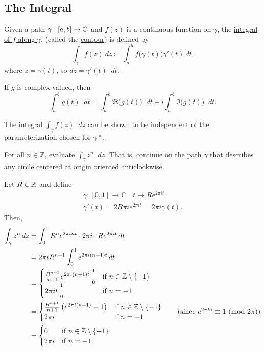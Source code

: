 \documentclass[11pt]{article}
\newcommand*\dif{\mathop{}\!d}
\newcommand{\Mod}[1]{\ (\mathrm{mod}\ #1)}
\begin{document}
\subsection{The Integral}
\begin{definition}
	Given a path $\gamma:[a,b] \to \mathbb{C}$ and $f(z)$ is a continuous function on
	$\gamma$, the \underline{integral of $f$ along $\gamma$}, (called the
	\underline{contour}) is defined by
	\begin{equation*}
		\int_\gamma f(z)\>dz \coloneqq \int^b_a f\big(\gamma(t)\big)\gamma'(t)\>dt.
	\end{equation*}
	where $z = \gamma(t)$, so $dz = \gamma'(t)\dif t$.
\end{definition}
\begin{remark}
	If $g$ is complex valued, then
	\begin{equation*}
		\int^b_a g(t)\dif t = \int^b_a \Re\big(g(t)\big)\dif t + i \int^b_a
		\Im\big(g(t)\big)\dif t.
	\end{equation*}
\end{remark}
\begin{remark}
	The integral $\int_\gamma f(z)\dif z$ can be shown to be independent of the
	parameterization chosen for $\gamma*$.
\end{remark}
\begin{example}\label{example1}
	For all $n \in \mathbb{Z}$, evaluate $\int_{\gamma} z^n \dif{z}$. That is,
	continue on the path $\gamma$ that describes any circle centered at origin
	oriented anticlockwise.
\end{example}
Let $R \in \mathbb{R}$ and define
\begin{gather*}
	\gamma: [0, 1] \to \mathbb{C} \quad t \mapsto Re^{2\pi i t} \\
	\gamma'(t) = 2R\pi i e^{2\pi i t} = 2 \pi i \gamma(t).
\end{gather*}
Then,
\begin{align*}
	\int_{\gamma} z^n \dif{z}
	&= \int_{0}^{1} R^ne^{2 \pi i n t} \cdot 2 \pi i \cdot Re^{2 \pi i t} \dif t \\
	&= 2 \pi i R^{n + 1} \int_{0}^{1} e^{2 \pi i (n + 1) t} \dif t \\
	&= \begin{cases}
	\frac{R^{n + 1}}{n + 1} e^{2 \pi i (n + 1) t} \Big|_{0}^{1} & \text{if } n \in
	\mathbb{Z} \setminus \{-1\} \\ 2 \pi i t \Big|_{0}^{1} & \text{if } n = -1
\end{cases} \\
&= \begin{cases}
\frac{R^{n + 1}}{n + 1} \left(e^{2 \pi i (n + 1)} - 1 \right) & \text{if } n \in
\mathbb{Z} \setminus \{-1\} \\ 2 \pi i  & \text{if } n = -1
\end{cases} \tag{since $e^{2 \pi k i} \equiv 1 \Mod{2 \pi}$}\\
&= \begin{cases}
0   & \text{if } n \in \mathbb{Z} \setminus \{-1\} \\
2 \pi i & \text{if } n = -1
\end{cases}
\end{align*}
\end{document}
